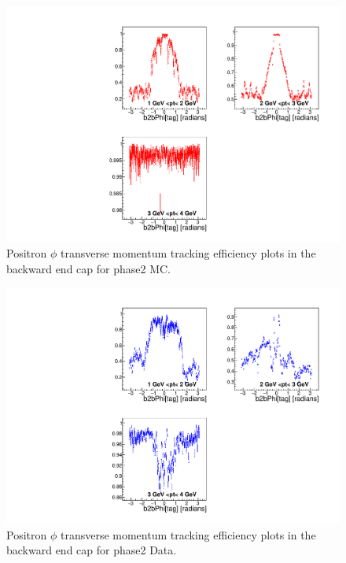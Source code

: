 \documentclass[a4paper,11pt,twosided,final,german,openbib,pdftex,listof=totoc,bibliography=totoc]{scrbook}
\begin{document}
\begin{appendix}
\begin{figure}[!htbp]
	\centering
	\includegraphics[width=\textwidth]{Plots/master/xPtMPhiepEC_MC}
	\caption[Transverse Momentum $\phi$ Positron Backward End Cap Efficiency Phase2 MC]{Positron $\phi$ transverse momentum tracking efficiency plots in the backward end cap for phase2 MC.}
	\label{plt:PtMPhiepEC_MC}
\end{figure}


\begin{figure}[!htbp]
	\centering
	\includegraphics[width=\textwidth]{Plots/master/xPtMPhiepEC_Data}
	\caption[Transverse Momentum $\phi$ Positron Backward End Cap Efficiency Phase2 Data]{Positron $\phi$ transverse momentum tracking efficiency plots in the backward end cap for phase2 Data.}
	\label{plt:PtMPhiepEC_Data}
\end{figure}


\end{appendix}
\end{document}
